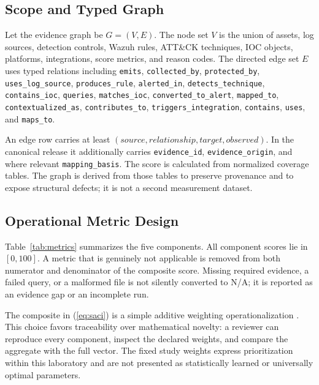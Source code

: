 \documentclass[a4paper,conference]{IEEEtran}
\begin{document}
\subsection{Scope and Typed Graph}
Let the evidence graph be $G=(V,E)$. The node set $V$ is the union of assets, log sources, detection controls, Wazuh rules, ATT\&CK techniques, IOC objects, platforms, integrations, score metrics, and reason codes. The directed edge set $E$ uses typed relations including \texttt{emits}, \texttt{collected\_by}, \texttt{protected\_by}, \texttt{uses\_log\_source}, \texttt{produces\_rule}, \texttt{alerted\_in}, \texttt{detects\_technique}, \texttt{contains\_ioc}, \texttt{queries}, \texttt{matches\_ioc}, \texttt{converted\_to\_alert}, \texttt{mapped\_to}, \texttt{contextualized\_as}, \texttt{contributes\_to}, \texttt{triggers\_integration}, \texttt{contains}, \texttt{uses}, and \texttt{maps\_to}.

An edge row carries at least $(source, relationship, target, observed)$. In the canonical release it additionally carries \texttt{evidence\_id}, \texttt{evidence\_origin}, and where relevant \texttt{mapping\_basis}. The score is calculated from normalized coverage tables. The graph is derived from those tables to preserve provenance and to expose structural defects; it is not a second measurement dataset.

\subsection{Operational Metric Design}
Table~\ref{tab:metrics} summarizes the five components. All component scores lie in $[0,100]$. A metric that is genuinely not applicable is removed from both numerator and denominator of the composite score. Missing required evidence, a failed query, or a malformed file is not silently converted to N/A; it is reported as an evidence gap or an incomplete run.

The composite in (\ref{eq:saci}) is a simple additive weighting operationalization \cite{triantaphyllou2000}. This choice favors traceability over mathematical novelty: a reviewer can reproduce every component, inspect the declared weights, and compare the aggregate with the full vector. The fixed study weights express prioritization within this laboratory and are not presented as statistically learned or universally optimal parameters.
\end{document}
